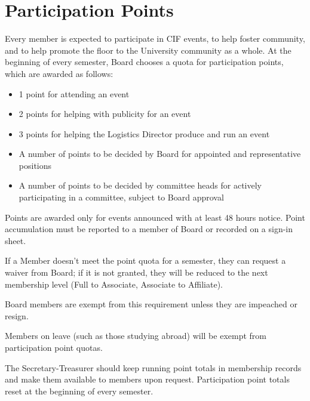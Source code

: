 \section{Participation Points}
\label{sec:participation-points}

Every member is expected to participate in CIF events, to help foster community, and to help promote the floor to the University community as a whole. At the beginning of every semester, Board chooses a quota for participation points, which are awarded as follows:
\begin{itemize}
	\item 1 point for attending an event
	\item 2 points for helping with publicity for an event
	\item 3 points for helping the Logistics Director produce and run an event
	\item A number of points to be decided by Board for appointed and representative positions
	\item A number of points to be decided by committee heads for actively participating in a committee, subject to Board approval
\end{itemize}
Points are awarded only for events announced with at least 48 hours notice.  Point accumulation must be reported to a member of Board or recorded on a sign-in sheet.

If a Member doesn't meet the point quota for a semester, they can request a waiver from Board; if it is not granted, they will be reduced to the next membership level (Full to Associate, Associate to Affiliate).

Board members are exempt from this requirement unless they are impeached or resign.

Members on leave (such as those studying abroad) will be exempt from participation point quotas.

The Secretary-Treasurer should keep running point totals in membership records and make them available to members upon request. Participation point totals reset at the beginning of every semester.
